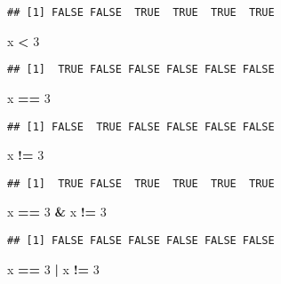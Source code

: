 \documentclass[]{book}
\newenvironment{Shaded}{\begin{snugshade}}{\end{snugshade}}
\newcommand{\DecValTok}[1]{\textcolor[rgb]{0.00,0.00,0.81}{#1}}
\newcommand{\StringTok}[1]{\textcolor[rgb]{0.31,0.60,0.02}{#1}}
\newcommand{\OperatorTok}[1]{\textcolor[rgb]{0.81,0.36,0.00}{\textbf{#1}}}
\newcommand{\NormalTok}[1]{#1}
\begin{document}
\begin{verbatim}
## [1] FALSE FALSE  TRUE  TRUE  TRUE  TRUE
\end{verbatim}

\begin{Shaded}
\begin{Highlighting}[]
\NormalTok{x }\OperatorTok{<}\StringTok{ }\DecValTok{3}
\end{Highlighting}
\end{Shaded}

\begin{verbatim}
## [1]  TRUE FALSE FALSE FALSE FALSE FALSE
\end{verbatim}

\begin{Shaded}
\begin{Highlighting}[]
\NormalTok{x }\OperatorTok{==}\StringTok{ }\DecValTok{3}
\end{Highlighting}
\end{Shaded}

\begin{verbatim}
## [1] FALSE  TRUE FALSE FALSE FALSE FALSE
\end{verbatim}

\begin{Shaded}
\begin{Highlighting}[]
\NormalTok{x }\OperatorTok{!=}\StringTok{ }\DecValTok{3}
\end{Highlighting}
\end{Shaded}

\begin{verbatim}
## [1]  TRUE FALSE  TRUE  TRUE  TRUE  TRUE
\end{verbatim}

\begin{Shaded}
\begin{Highlighting}[]
\NormalTok{x }\OperatorTok{==}\StringTok{ }\DecValTok{3} \OperatorTok{&}\StringTok{ }\NormalTok{x }\OperatorTok{!=}\StringTok{ }\DecValTok{3}
\end{Highlighting}
\end{Shaded}

\begin{verbatim}
## [1] FALSE FALSE FALSE FALSE FALSE FALSE
\end{verbatim}

\begin{Shaded}
\begin{Highlighting}[]
\NormalTok{x }\OperatorTok{==}\StringTok{ }\DecValTok{3} \OperatorTok{|}\StringTok{ }\NormalTok{x }\OperatorTok{!=}\StringTok{ }\DecValTok{3}
\end{Highlighting}
\end{Shaded}
\end{document}
